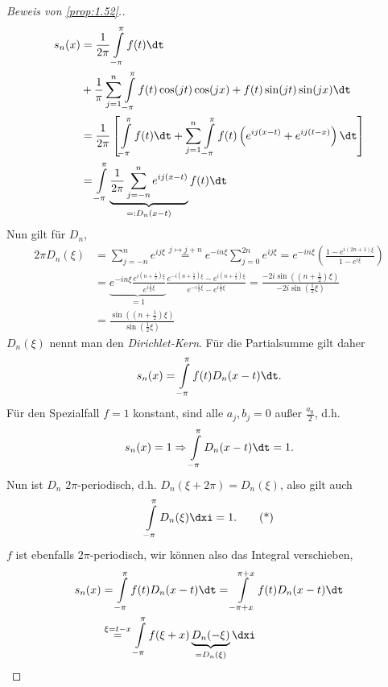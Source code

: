 \begin{proof}[Beweis von \ref{prop:1.52}.]
\begin{align*}
s_n(x) &= \frac{1}{2\pi}\int\limits_{-\pi}^\pi f(t)\dt\\
&+ \frac{1}{\pi}\sum\limits_{j=1}^n \int\limits_{-\pi}^\pi
f(t)\cos(jt)\cos(jx) + f(t)\sin(jt)\sin(jx)\dt\\
&= \frac{1}{2\pi}\left[ 
\int\limits_{-\pi}^\pi f(t)\dt + \sum\limits_{j=1}^n \int\limits_{-\pi}^\pi 
f(t)\left(e^{ij(x-t)} + e^{ij(t-x)}\right)\dt\right]\\
&= \int\limits_{-\pi}^\pi \underbrace{\frac{1}{2\pi}\sum\limits_{j=-n}^n
e^{ij(x-t)}}_{=: D_n(x-t)}f(t)\dt
\end{align*}
Nun gilt für $D_n$,
\begin{align*}
2\pi D_n(\xi) &= \sum\limits_{j=-n}^n e^{ij\xi}
\overset{j\mapsto j+n}{=} e^{-in\xi}\sum\limits_{j=0}^{2n} e^{ij\xi}
= e^{-in\xi}\left(\frac{1-e^{i(2n+1)\xi}}{1-e^{i\xi}}\right)\\
&= \underbrace{e^{-in\xi}
\frac{e^{i(n+\frac{1}{2})\xi}}{e^{i\frac{1}{2}\xi}}}_{=1} 
\frac{e^{-i(n+\frac{1}{2})\xi}-e^{i(n+\frac{1}{2})\xi}}{e^{-i\frac{1}{2}\xi}-e^{i\frac{1}{2}\xi}}
= \frac{-2i\sin\left(\left(n+\frac{1}{2}\right)\xi\right)}
{-2i\sin\left(\frac{1}{2}\xi\right)}\\
&= \frac{\sin\left(\left(n+\frac{1}{2}\right)\xi\right)}
{\sin\left(\frac{1}{2}\xi\right)}
\end{align*}
$D_n(\xi)$ nennt man den \emph{Dirichlet-Kern}. Für die Partialsumme gilt daher
\begin{align*}
s_n(x) = \int\limits_{-\pi}^\pi f(t)D_n(x-t)\dt.
\end{align*}
Für den Spezialfall $f=1$ konstant, sind alle $a_j,b_j = 0$ außer
$\frac{a_0}{2}$, d.h.
\begin{align*}
s_n(x) = 1 \Rightarrow \int\limits_{-\pi}^\pi D_n(x-t)\dt = 1.
\end{align*}
Nun ist $D_n$ $2\pi$-periodisch, d.h. $D_n(\xi+2\pi) = D_n(\xi)$, also gilt auch
\begin{align*}
\int\limits_{-\pi}^\pi D_n(\xi)\dxi = 1.\tag{*}
\end{align*}
$f$ ist ebenfalls $2\pi$-periodisch, wir können also das Integral verschieben,
\begin{align*}
s_n(x) &= \int\limits_{-\pi}^\pi f(t)D_n(x-t)\dt
= \int\limits_{-\pi+x}^{\pi+x} f(t)D_n(x-t)\dt\\
&\overset{\xi=t-x}{=} \int\limits_{-\pi}^{\pi}
f(\xi+x)\underbrace{D_n(-\xi)}_{=D_n(\xi)}\dxi\qedhere
\end{align*}
\end{proof}

